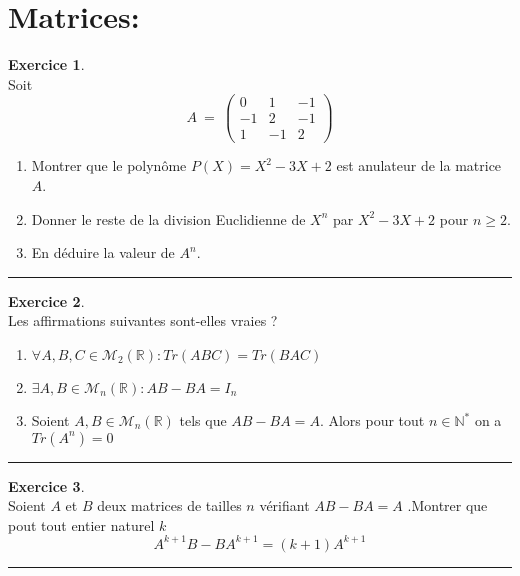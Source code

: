 \documentclass[a4paper,10pt]{article}
\theoremstyle{definition}
\theoremstyle{definition}
\newtheorem{exo}{Exercice}
\newcommand{\R}{\mathbb{R}}
\newcommand{\N}{\mathbb{N}}
\begin{document}
\section*{Matrices:}
\begin{minipage}{1\linewidth}
\begin{minipage}[t]{0.48\linewidth}
\raggedright

\begin{exo}\quad\\
Soit $$A \ = \ \begin{pmatrix}
0 & 1 & -1\\
-1 &  2& -1\\
1 & -1 & 2
\end{pmatrix}$$
\begin{enumerate}
\item Montrer que le polynôme $P(X) = X^2-3X+2$ est anulateur de la matrice $A$.
\item Donner le reste de la division Euclidienne de $X^n$ par  $X^2-3X+2$ pour $n\geq 2$.
\item En déduire la valeur de $A^n$. 
\end{enumerate}

\centering
\rule{1\linewidth}{0.6pt}
\end{exo}

\begin{exo}\quad\\
Les affirmations suivantes sont-elles vraies ? 
\begin{enumerate}
\item $\forall A,B,C\in\mathcal{M}_{2}\left(\R\right) : Tr(ABC) = Tr(BAC)  $
\item $\exists A,B \in \mathcal{M}_{n}\left(\R\right) : AB - BA = I_n $
\item  Soient $A,B \in \mathcal{M}_{n}\left(\R\right) $  tels que $AB - BA = A $. Alors pour tout $n\in\N^*$ on a $Tr(A^n) = 0$
\end{enumerate}

\centering\rule{1\linewidth}{0.6pt}
\end{exo}

\begin{exo}\quad\\
Soient $A$ et $B$ deux matrices de tailles $n$ vérifiant $AB-BA=A$ .Montrer que pout tout entier naturel $k$
$$A^{k+1}B  - BA^{k+1}= (k+ 1)A^{k+1}$$


\centering\rule{1\linewidth}{0.6pt}
\end{exo}




\end{minipage}
\end{minipage}
\end{document}
